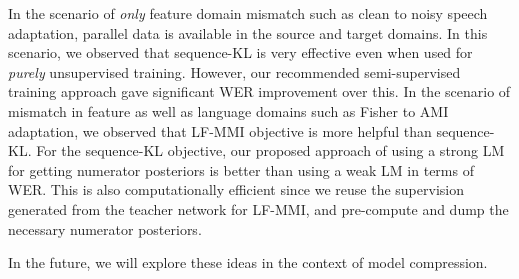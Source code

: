 \documentclass{article}
\begin{document}
In the scenario of {\em only} feature domain mismatch such as clean to noisy speech adaptation, 
parallel data is available in the source and target domains. 
In this scenario, we observed that sequence-KL is very
effective even when used for {\em purely} unsupervised training. 
However,  our recommended semi-supervised training approach 
gave significant WER improvement over this. 
In the scenario of mismatch in feature as well as language domains such as Fisher to AMI adaptation, we observed that LF-MMI objective is more helpful than sequence-KL.
For the sequence-KL objective, our proposed approach of using a strong LM for getting numerator
posteriors is better than using a weak LM in terms of WER. This is also computationally efficient since we reuse the supervision generated from the teacher network for LF-MMI, and pre-compute and dump the necessary numerator posteriors.


In the future, we will explore these ideas in the context of model
compression.

\vfill
\pagebreak




\end{document}
